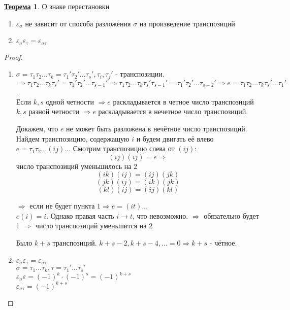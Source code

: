 \documentclass[12pt]{article}
\newenvironment{MyList}[1][4pt]{
  \begin{enumerate}[1.]
  \setlength{\parskip}{0pt}
  \setlength{\itemsep}{#1}
}{       
  \end{enumerate}
}
\theoremstyle{definition} %
\newtheorem{Thm}{\underline{Теорема}}[subsection] %
\theoremstyle{plain} %
\theoremstyle{remark} %
\begin{document}
{\begin{Thm} О знаке перестановки
    \begin{MyList}
        \item $\varepsilon_\sigma$ не зависит от способа разложения $\sigma$ на произведение транспозиций
        \item $\varepsilon_\sigma \varepsilon_\tau = \varepsilon_{\sigma \tau}$
    \end{MyList}
\end{Thm}

\begin{proof}
    \begin{MyList}
        \item $\sigma = \tau_1 \tau_2 ... \tau_k = \tau_1 ' \tau_2 ' ... \tau_s ', \tau_i, \tau_j '$ - транспозиции. \\
        $\Rightarrow \tau_1 \tau_2 ... \tau_k \tau_s ' = \tau_1 ' \tau_2 ' ... \tau_{s - 1} ' \Rightarrow  \tau_1 \tau_2 ... \tau_k \tau_s ' \tau_{s - 1} ' = \tau_1 ' \tau_2 ' ... \tau_{s - 2} '
            \Rightarrow e = \tau_1 \tau_2 ... \tau_k \tau_s ' ... \tau_1 '$. \\ Если $k, s$ одной четности $\Rightarrow e $ раскладывается в четное число транспозиций \\
        $k, s$ разной четности $\Rightarrow e$ раскладывается в нечетное число транспозиций.

        Докажем, что $e$ не может быть разложена в нечётное число транспозиций. Найдем транспозицию, содержащую $i$ и будем двигать её влево\\
        $e = \tau_1 \tau_2 ... (ij) ...$ \newpage Смотрим транспозицию слева от $(ij)$:
        $$(ij)(ij) = e \Rightarrow$$ число транспозиций уменьшилось на $2$
        $$(ik)(ij) = (ij)(jk)$$
        $$(jk)(ij) = (ik)(jk)$$
        $$(kl)(ij) = (ij)(kl)$$

        $\Rightarrow$ если не будет пункта $1 \Rightarrow e = (it)...$ \\
        $e(i) = i$. Однако правая часть $i \to t$, что невозможно. $\Rightarrow$ обязательно будет 1 $\Rightarrow$ число транспозиций уменьшится на 2

        Было $k + s$ транспозиций. $k + s - 2, k + s - 4, ... = 0 \Rightarrow k + s$ - чётное.

        \item $\varepsilon_\sigma \varepsilon_\tau = \varepsilon_{\sigma \tau}$ \\
        $\sigma = \tau_1 ... \tau_k, \tau = \tau_1 ' ... \tau_s ' $ \\
        $\varepsilon_\sigma \varepsilon = (-1)^k \cdot (-1)^s = (-1)^{k + s}$ \\
        $\varepsilon_{\sigma \tau} = (-1)^{k + s}$
    \end{MyList}
\end{proof}

}
\end{document}
